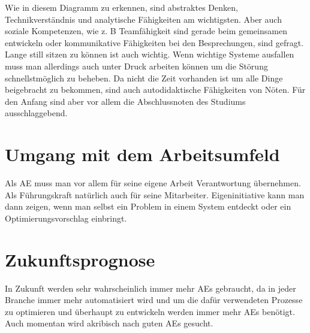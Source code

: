Wie in diesem Diagramm zu erkennen, sind abstraktes Denken, Technikverständnis und analytische Fähigkeiten am wichtigsten. Aber auch soziale Kompetenzen, wie z. B Teamfähigkeit sind gerade beim gemeinsamen entwickeln oder kommunikative Fähigkeiten bei den Besprechungen, sind gefragt. Lange still sitzen zu können ist auch wichtig. Wenn wichtige Systeme ausfallen muss man allerdings auch unter Druck arbeiten können um die Störung schnellstmöglich zu beheben. Da nicht die Zeit vorhanden ist um alle Dinge beigebracht zu bekommen, sind auch autodidaktische Fähigkeiten von Nöten. Für den Anfang sind aber vor allem die Abschlussnoten des Studiums ausschlaggebend. 

\section{Umgang mit dem Arbeitsumfeld}

    Als AE muss man vor allem für seine eigene Arbeit Verantwortung übernehmen. Als Führungskraft natürlich auch für seine Mitarbeiter. Eigeninitiative kann man dann zeigen, wenn man selbst ein Problem in einem System entdeckt oder ein Optimierungsvorschlag einbringt. 

\section{Zukunftsprognose}

In Zukunft werden sehr wahrscheinlich immer mehr AEs gebraucht, da in jeder Branche immer mehr automatisiert wird und um die dafür verwendeten Prozesse zu optimieren und überhaupt zu entwickeln werden immer mehr AEs benötigt. Auch momentan wird akribisch nach guten AEs gesucht. 